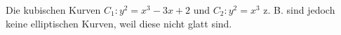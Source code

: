
	Die kubischen Kurven $C_1\colon y^2 = x^3 - 3x +2$ und $C_2\colon y^2 = x^3$ z. B. sind jedoch keine elliptischen Kurven, weil diese nicht glatt sind. \\

